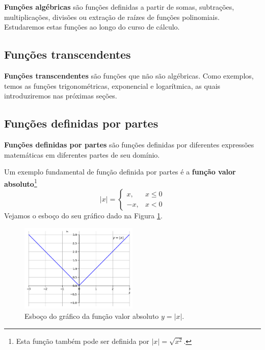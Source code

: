 \documentclass[../main.tex]{subfiles}
\begin{document}
{\bf Funções algébricas} são funções definidas a partir de somas, subtrações, multiplicações, divisões ou extração de raízes de funções polinomiais. Estudaremos estas funções ao longo do curso de cálculo.
\subsection{Funções transcendentes}

{\bf Funções transcendentes}{} são funções que não são algébricas. Como exemplos, temos as funções trigonométricas, exponencial e logarítmica, as quais introduziremos nas próximas seções.
\subsection{Funções definidas por partes}

\textbf{Funções definidas por partes} são funções definidas por diferentes expressões matemáticas em diferentes partes de seu domínio.

Um exemplo fundamental de função definida por partes é a \textbf{função valor absoluto}\footnote{Esta função também pode ser definida por $|x| = \sqrt{x^2}$.}
\begin{equation}
  |x| = \left\{
    \begin{array}{ll}
      x, & x\leq 0\\
      -x, & x<0
    \end{array}
\right.
\end{equation}
Vejamos o esboço do seu gráfico dado na Figura \ref{fig:cap_funcao_funabs}.

\begin{figure}[!htb]
  \centering
  \includegraphics[width=0.5\textwidth]{fig_func/fig_cap_funcao_funabs}
  \caption{Esboço do gráfico da função valor absoluto $y=|x|$.}
  \label{fig:cap_funcao_funabs}
\end{figure}
\end{document}
